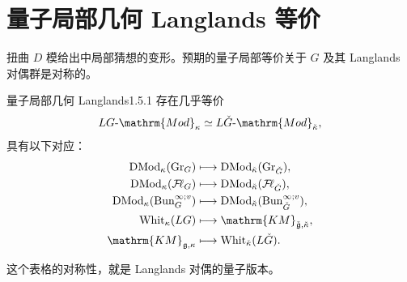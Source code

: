 \section{量子局部几何 Langlands 等价}\label{sec:1.5}
扭曲 $D$ 模给出中局部猜想的变形。预期的量子局部等价关于 $G$ 及其 Langlands 对偶群是对称的。
\begin{conjecture}{量子局部几何 Langlands}{1.5.1}
存在几乎等价
\[LG\text{-}\mathrm{Mod}_\kappa\simeq L\checkG\text{-}\mathrm{Mod}_{\check\kappa},\]
具有以下对应：
\[
\begin{aligned}
\DMod_\kappa(\Gr_G)&\longmapsto\DMod_{\check\kappa}(\Gr_{\checkG}),\\
\DMod_\kappa(\Fl_G)&\longmapsto\DMod_{\check\kappa}(\Fl_{\checkG}),\\
\DMod_\kappa(\Bun_G^{\infty;v})&\longmapsto\DMod_{\check\kappa}(\Bun_{\checkG}^{\infty;v}),\\
\Whit_\kappa(LG)&\longmapsto\mathrm{KM}_{\check{\mathfrak g},\check\kappa},\\
\mathrm{KM}_{\mathfrak g,\kappa}&\longmapsto\Whit_{\check\kappa}(L\checkG).
\end{aligned}
\]
\end{conjecture}

这个表格的对称性，就是 Langlands 对偶的量子版本。
